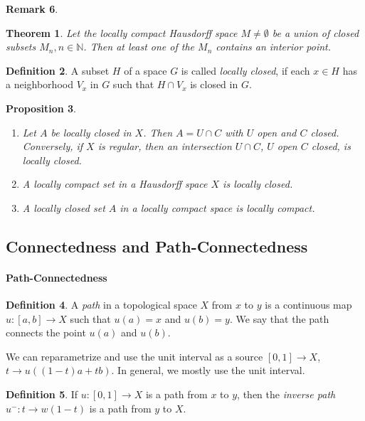 \documentclass[11pt,a4paper]{article}
\theoremstyle{definition}
\newtheorem{definition}{Definition}[section]
\newtheorem{remark}[definition]{Remark}
\theoremstyle{plain}
\newtheorem{theorem}[definition]{Theorem}
\newtheorem{proposition}[definition]{Proposition}
\theoremstyle{remark}
\begin{document}
\begin{remark}
\begin{theorem}
  Let the locally compact Hausdorff space $M \neq \emptyset$ be a union of closed subsets $M_n, n \in \mathbb{N}$. Then at least one 
  of the $M_n$ contains an interior point. 
\end{theorem}

\begin{definition}
  A subset $H$ of a space $G$ is called \emph{locally closed}, if each $x \in H$ has a neighborhood $V_x$ in $G$ 
  such that $H \cap V_x$ is closed in $G$. 
\end{definition}

\begin{proposition}
  \begin{enumerate}
    \item Let $A$ be locally closed in $X$. Then $A = U \cap C$ with $U$ open and $C$ closed. Conversely, if $X$ is regular, 
    then an intersection $U \cap C$, $U$ open $C$ closed, is locally closed. 

    \item A locally compact set in a Hausdorff space $X$ is locally closed. 
    \item A locally closed set $A$ in a locally compact space is locally compact. 
  \end{enumerate}
\end{proposition}

\subsection{Connectedness and Path-Connectedness}
\paragraph{Path-Connectedness}
\begin{definition}
  A \emph{path} in a topological space $X$ from $x$ to $y$ is a continuous map $u \colon [a,b] \to X$ 
  such that $u(a) = x$ and $u(b) = y$. We say that the path connects the point $u(a)$ and $u(b)$.
  
  We can reparametrize and use the unit interval as a source $[0,1] \to X$, $t \to u\left((1-t)a + t b\right)$.
  In general, we mostly use the unit interval. 
\end{definition}

\begin{definition}
  If $u \colon [0,1] \to X$ is a path from $x$ to $y$, then the \emph{inverse path} 
  $u^{-} \colon t \to w(1-t)$ is a path from $y$ to $X$. 
\end{definition}


\end{remark}
\end{document}
